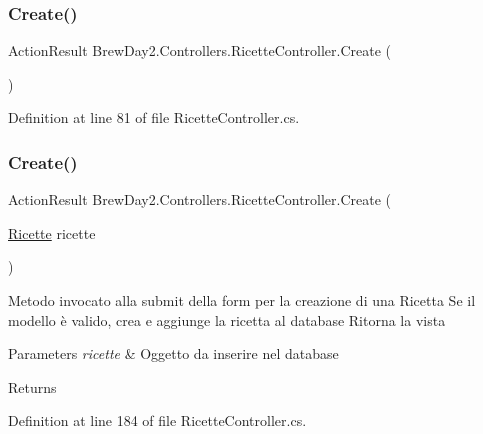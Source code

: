 \subsubsection{\texorpdfstring{Create()}{Create()}\hspace{0.1cm}{\footnotesize\ttfamily [1/2]}}
{\footnotesize\ttfamily Action\+Result Brew\+Day2.\+Controllers.\+Ricette\+Controller.\+Create (\begin{DoxyParamCaption}{ }\end{DoxyParamCaption})}



Definition at line 81 of file Ricette\+Controller.\+cs.

\mbox{\label{class_brew_day2_1_1_controllers_1_1_ricette_controller_a9a3bcf974c5617407eb6838bfc8a695f}} 
\subsubsection{\texorpdfstring{Create()}{Create()}\hspace{0.1cm}{\footnotesize\ttfamily [2/2]}}
{\footnotesize\ttfamily Action\+Result Brew\+Day2.\+Controllers.\+Ricette\+Controller.\+Create (\begin{DoxyParamCaption}\item[{\mbox{\hyperlink{class_brew_day2_1_1_models_1_1_ricette}{Ricette}}}]{ricette }\end{DoxyParamCaption})}



Metodo invocato alla submit della form per la creazione di una Ricetta Se il modello è valido, crea e aggiunge la ricetta al database Ritorna la vista 


\begin{DoxyParams}{Parameters}
{\em ricette} & Oggetto da inserire nel database\\
\hline
\end{DoxyParams}
\begin{DoxyReturn}{Returns}

\end{DoxyReturn}


Definition at line 184 of file Ricette\+Controller.\+cs.

